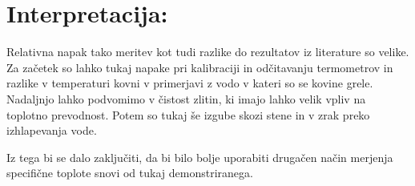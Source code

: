 \documentclass[a4paper]{article}
\begin{document}
\section*{Interpretacija:}

Relativna napak tako meritev kot tudi razlike do rezultatov iz literature so velike. 
Za začetek so lahko tukaj napake pri kalibraciji in odčitavanju termometrov in razlike v temperaturi kovni v primerjavi z vodo v kateri so se kovine grele. Nadaljnjo lahko podvomimo v čistost zlitin, ki imajo lahko velik vpliv na toplotno prevodnost. Potem so tukaj še izgube skozi stene in v zrak preko izhlapevanja vode. 

Iz tega bi se dalo zaključiti, da bi bilo bolje uporabiti drugačen način merjenja specifične toplote snovi od tukaj demonstriranega.
\end{document}
